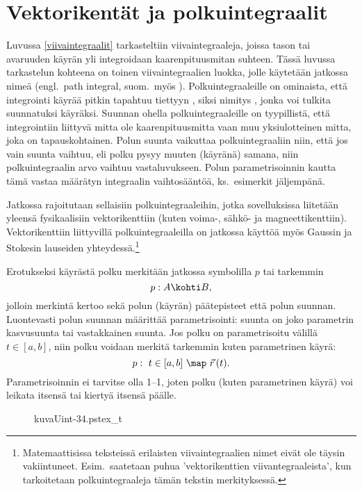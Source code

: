 \section{Vektorikentät ja polkuintegraalit} \label{polkuintegraalit}
\alku
{}

Luvussa \ref{viivaintegraalit} tarkasteltiin viivaintegraaleja, joissa tason tai avaruuden
käyrän yli integroidaan kaarenpituusmitan suhteen. Tässä luvussa tarkastelun kohteena on toinen
viivaintegraalien luokka, jolle käytetään jatkossa nimeä 
(engl.\ path integral, suom.\ myös ). Polkuintegraaleille on ominaista, että
integrointi käyrää pitkin tapahtuu tiettyyn , siksi nimitys , jonka
voi tulkita suunnatuksi käyräksi. Suunnan ohella polkuintegraaleille on tyypillistä, että
integrointiin liittyvä mitta  ole kaarenpituusmitta vaan muu yksi\-ulotteinen mitta,
joka on tapauskohtainen. Polun suunta vaikuttaa polkuintegraaliin niin, että jos vain suunta
vaihtuu, eli polku pysyy muuten (käyränä) samana, niin polkuintegraalin arvo vaihtuu
vastaluvukseen. Polun parametrisoinnin kautta tämä vastaa määrätyn integraalin vaihtosääntöä,
ks.\ esimerkit jäljempänä.

Jatkossa rajoitutaan sellaisiin polkuintegraaleihin, jotka sovelluksissa liitetään yleensä
fysikaalisiin vektorikenttiin (kuten voima-, sähkö- ja magneettikenttiin). Vektorikenttiin
liittyvillä polkuintegraaleilla on jatkossa käyttöä myös Gaussin ja Stokesin lauseiden
yhteydessä.\footnote[2]{Matemaattisissa teksteissä erilaisten viivaintegraalien nimet eivät ole
täysin vakiintuneet. Esim.\ saatetaan puhua 'vektorikenttien viivantegraaleista', kun
tarkoitetaan polkuintegraaleja tämän tekstin merkityksessä.}

Erotukseksi käyrästä polku merkitään jatkossa symbolilla $p$ tai tarkemmin
\[
p: A \kohti B,
\]
jolloin merkintä kertoo sekä polun (käyrän) päätepisteet että polun suunnan. Luontevasti
polun suunnan määrittää parametrisointi: suunta on joko parametrin kasvusuunta tai vastakkainen
suunta. Jos polku on parametrisoitu välillä $t\in[a,b]$, niin polku voidaan merkitä tarkemmin
kuten parametrinen käyrä:   
\[ 
p:\ t \in [a,b]\ \map\ \vec r\,(t).
\]
Parametrisoinnin ei tarvitse olla 1--1, joten polku (kuten parametrinen käyrä) voi leikata
itsensä tai kiertyä itsensä päälle.
\begin{figure}[H]
\begin{center}
{kuvaUint-34.pstex_t}
\end{center}
\end{figure}

